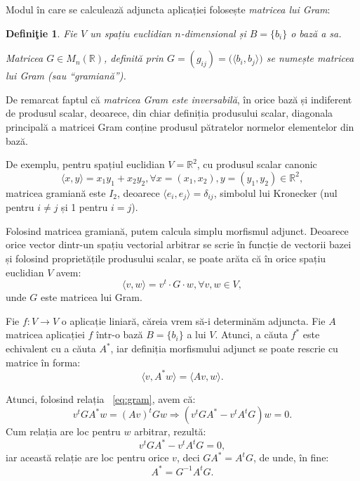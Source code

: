 \documentclass[11pt,a4paper]{article}
\newcommand\qq{\enquote}
\newcommand\RR{\mathbb{R}}
\theoremstyle{dotless}
\theoremstyle{dotlessdr}
\newtheorem{definition}{Defini\c{t}ie}[section]
\begin{document}
Modul în care se calculează adjuncta aplicației folosește \emph{matricea lui Gram}:

\begin{definition}\label{def:gram}
  Fie $V$ un spațiu euclidian $n$-dimensional și $B = \{b_i\}$ o bază a sa.

  Matricea $G \in M_n(\RR)$, definită prin $G = (g_{ij}) = \big( \langle b_i, b_j \rangle \big)$
  se numește \emph{matricea lui Gram} (sau \emph{\qq{gramiană}}).
\end{definition}

De remarcat faptul că \emph{matricea Gram este inversabilă}, în orice bază și indiferent de
produsul scalar, deoarece, din chiar definiția produsului scalar, diagonala principală
a matricei Gram conține produsul pătratelor normelor elementelor din bază.

De exemplu, pentru spațiul euclidian $V = \RR^2$, cu produsul scalar canonic
\[
  \langle x, y \rangle = x_1 y_1 + x_2 y_2, \forall x = (x_1, x_2), y = (y_1, y_2) \in \RR^2,
\]
matricea gramiană este $I_2$, deoarece $\langle e_i, e_j \rangle = \delta_{ij}$, simbolul
lui Kronecker (nul pentru $i \neq j$ și 1 pentru $i = j$).

Folosind matricea gramiană, putem calcula simplu morfismul adjunct. Deoarece orice vector
dintr-un spațiu vectorial arbitrar se scrie în funcție de vectorii bazei și folosind
proprietățile produsului scalar, se poate arăta că în orice spațiu euclidian $V$ avem:
\begin{equation}
  \label{eq:gram}
  \langle v, w \rangle = v^t \cdot G \cdot w, \forall v, w \in V,
\end{equation}
unde $G$ este matricea lui Gram.

Fie $f : V \to V$ o aplicație liniară, căreia vrem să-i determinăm adjuncta. Fie $A$ matricea
aplicației $f$ într-o bază $B = \{b_i\}$ a lui $V$. Atunci, a căuta $f^\ast$ este echivalent
cu a căuta $A^\ast$, iar definiția morfismului adjunct se poate rescrie cu matrice în forma:
\[
  \langle v, A^\ast w \rangle = \langle Av, w \rangle.
\]

Atunci, folosind relația ~\eqref{eq:gram}, avem că:
\[
  v^t GA^\ast w = (Av)^t Gw \Rightarrow (v^t GA^\ast - v^t A^t G) w = 0.
\]
Cum relația are loc pentru $w$ arbitrar, rezultă:
\[
  v^t GA^\ast - v^t A^t G = 0,
\]
iar această relație are loc pentru orice $v$, deci $GA^\ast = A^t G$, de unde, în fine:
\[
  A^\ast = G^{-1} A^t G.
\]


\end{document}
